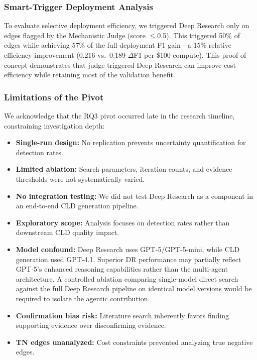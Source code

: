 \subsubsection{Smart-Trigger Deployment Analysis}

To evaluate selective deployment efficiency, we triggered Deep Research only on edges flagged by the Mechanistic Judge (score $\leq$0.5). This triggered 50\% of edges while achieving 57\% of the full-deployment F1 gain---a 15\% relative efficiency improvement (0.216 vs.\ 0.189 $\Delta$F1 per \$100 compute). This proof-of-concept demonstrates that judge-triggered Deep Research can improve cost-efficiency while retaining most of the validation benefit.

\subsubsection{Limitations of the Pivot}

We acknowledge that the RQ3 pivot occurred late in the research timeline, constraining investigation depth:
\begin{itemize}[noitemsep]
    \item \textbf{Single-run design:} No replication prevents uncertainty quantification for detection rates.
    \item \textbf{Limited ablation:} Search parameters, iteration counts, and evidence thresholds were not systematically varied.
    \item \textbf{No integration testing:} We did not test Deep Research as a component in an end-to-end CLD generation pipeline.
    \item \textbf{Exploratory scope:} Analysis focuses on detection rates rather than downstream CLD quality impact.
    \item \textbf{Model confound:} Deep Research uses GPT-5/GPT-5-mini, while CLD generation used GPT-4.1. Superior DR performance may partially reflect GPT-5's enhanced reasoning capabilities rather than the multi-agent architecture. A controlled ablation comparing single-model direct search against the full Deep Research pipeline on identical model versions would be required to isolate the agentic contribution.
    \item \textbf{Confirmation bias risk:} Literature search inherently favors finding supporting evidence over disconfirming evidence.
    \item \textbf{TN edges unanalyzed:} Cost constraints prevented analyzing true negative edges.
\end{itemize}

